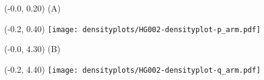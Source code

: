 \documentclass{article}
\begin{document}
\begin{textblock}{13}(-0.0,  0.20) \LARGE{(A)} \end{textblock}
\begin{textblock}{13}(-0.2,  0.40) \texttt{[image: densityplots/HG002-densityplot-p\_arm.pdf]}   \end{textblock}

\begin{textblock}{13}(-0.0,  4.30) \LARGE{(B)} \end{textblock}
\begin{textblock}{13}(-0.2,  4.40) \texttt{[image: densityplots/HG002-densityplot-q\_arm.pdf]}   \end{textblock}
\end{document}
